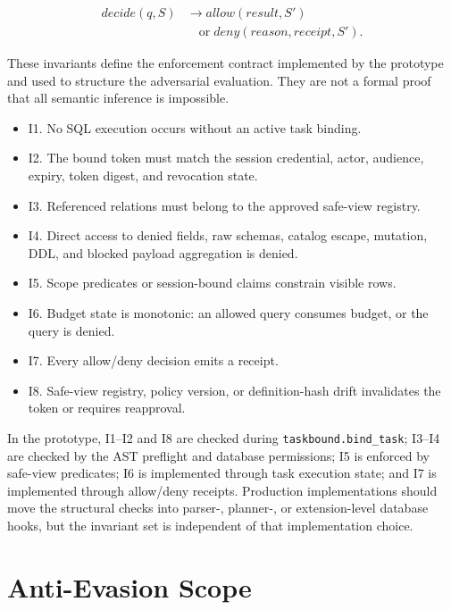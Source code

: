\documentclass[journal]{IEEEtran}
\providecommand{\tightlist}{%
  \setlength{\itemsep}{0pt}\setlength{\parskip}{0pt}}
\begin{document}
\begin{equation}
\begin{aligned}
decide(q,S) &\rightarrow allow(result,S')\\
            &\quad \mathrm{or}\; deny(reason,receipt,S').
\end{aligned}
\end{equation}

These invariants define the enforcement contract implemented by the
prototype and used to structure the adversarial evaluation. They are not
a formal proof that all semantic inference is impossible.

\begin{itemize}
\tightlist
\item
  I1. No SQL execution occurs without an active task binding.
\item
  I2. The bound token must match the session credential, actor,
  audience, expiry, token digest, and revocation state.
\item
  I3. Referenced relations must belong to the approved safe-view
  registry.
\item
  I4. Direct access to denied fields, raw schemas, catalog escape,
  mutation, DDL, and blocked payload aggregation is denied.
\item
  I5. Scope predicates or session-bound claims constrain visible rows.
\item
  I6. Budget state is monotonic: an allowed query consumes budget, or
  the query is denied.
\item
  I7. Every allow/deny decision emits a receipt.
\item
  I8. Safe-view registry, policy version, or definition-hash drift
  invalidates the token or requires reapproval.
\end{itemize}

In the prototype, I1--I2 and I8 are checked during
\texttt{taskbound.bind\_task}; I3--I4 are checked by the AST preflight
and database permissions; I5 is enforced by safe-view predicates; I6 is
implemented through task execution state; and I7 is implemented through
allow/deny receipts. Production implementations should move the
structural checks into parser-, planner-, or extension-level database
hooks, but the invariant set is independent of that implementation
choice.


\hypertarget{anti-evasion-scope}{%
\section{Anti-Evasion Scope}\label{anti-evasion-scope}}
\end{document}
